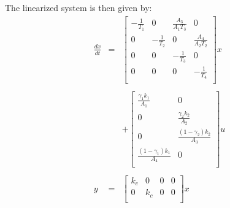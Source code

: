 The linearized system is then given by:
\begin{equation}
    \begin{array}{rcl}
        \frac{dx}{dt} & = & 
        \left[
            \begin{array}{cccc}
                -\frac{1}{T_1} & 0 & \frac{A_3}{A_1 T_3} & 0 \\
                0 & -\frac{1}{T_2} & 0 & \frac{A_4}{A_2 T_2} \\
                0 & 0 & -\frac{1}{T_3} & 0 \\
                0 & 0 & 0 & -\frac{1}{T_4} \\
            \end{array}
        \right] x  \\ 
        & & \\
        & & + \left[ 
            \begin{array}{cc}
                \frac{\gamma_1k_1}{A_1} & 0 \\
                0 & \frac{\gamma_2k_2}{A_2} \\
                0 & \frac{(1-\gamma_2)k_2}{A_3} \\
                \frac{(1-\gamma_1)k_1}{A_4} & 0 \\
            \end{array}
        \right] u 
        \\
        & & \\
        y & = & 
        \left[
            \begin{array}{cccc}
                k_c & 0 & 0 & 0 \\
                0 & k_c & 0 & 0 \\
            \end{array}
        \right] x 
        \\
    \end{array}
    \label{linearizedsyseq}
\end{equation}
